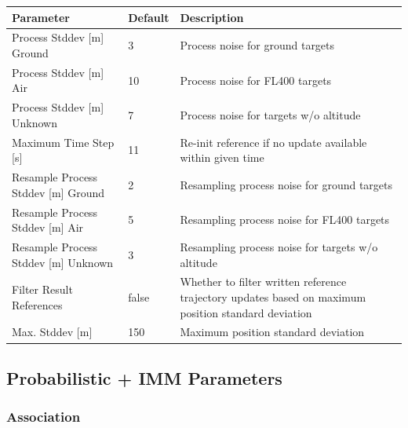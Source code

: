 \begin{table}[H]
  \center
  \begin{tabularx}{\textwidth}{ | l | l | X |}
    \hline
    \textbf{Parameter} & \textbf{Default} &  \textbf{Description} \\ \hline
    Process Stddev [m] Ground & 3 & Process noise for ground targets \\ \hline
    Process Stddev [m] Air & 10 & Process noise for FL400 targets \\ \hline
    Process Stddev [m] Unknown & 7 & Process noise for targets w/o altitude \\ \hline
    Maximum Time Step [s] & 11 & Re-init reference if no update available within given time \\ \hline
    Resample Process Stddev [m] Ground & 2 & Resampling process noise for ground targets \\ \hline
    Resample Process Stddev [m] Air & 5 & Resampling process noise for FL400 targets \\ \hline
    Resample Process Stddev [m] Unknown & 3 & Resampling process noise for targets w/o altitude \\ \hline    
    Filter Result References& false & Whether to filter written reference trajectory updates based on maximum position standard deviation \\ \hline
    Max. Stddev [m] & 150 & Maximum position standard deviation \\ \hline
  \end{tabularx}
\end{table}


\subsection{Probabilistic + IMM Parameters}

\subsubsection{Association}

